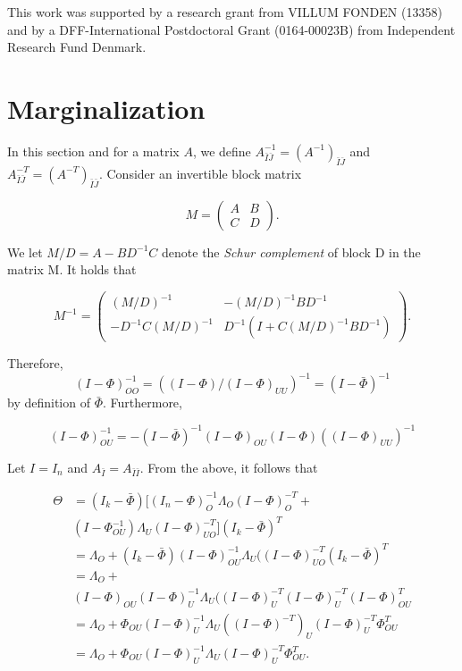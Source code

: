 \documentclass[accepted]{uai2021} %
\begin{document}
\begin{acknowledgements} %
    This work was supported by a research grant from
    VILLUM FONDEN (13358) and by a DFF-International Postdoctoral Grant 
    (0164-00023B) from Independent Research Fund Denmark.
\end{acknowledgements}

\appendix

\section{Marginalization}
\label{sec:marg}

In this section and for a matrix $A$, we define $A_{\bar{I}\bar{J}}^{-1} = 
(A^{-1})_{\bar{I}\bar{J}}$ and 
$A_{\bar{I}\bar{J}}^{-T}=(A^{-T})_{\bar{I}\bar{J}}$. Consider an invertible 
block matrix 

$$
M=
\begin{pmatrix}
A & B \\
C & D
\end{pmatrix}.
$$

We let $M / D = A - BD^{-1}C$ denote the \emph{Schur complement} of block D in 
the matrix M. It holds that

$$
M^{-1}=
\begin{pmatrix}
(M/D)^{-1} & -(M/D)^{-1}BD^{-1} \\
-D^{-1}C(M/D)^{-1} & D^{-1}(I + C(M/D)^{-1}BD^{-1})
\end{pmatrix}.
$$

Therefore, $$(I - {\Phi})_{OO}^{-1} = ((I - {\Phi})/(I - 
{\Phi})_{UU})^{-1} = (I- \bar{\Phi})^{-1}$$ by definition of 
$\bar{\Phi}$. 
Furthermore, 

$$
(I-{\Phi})_{OU}^{-1} = 
-(I-\bar{\Phi})^{-1}(I-{\Phi})_{OU}(I-{\Phi})((I-{\Phi})_{UU})^{-1}
$$

Let $I = I_n$ and $A_{\bar{I}}=A_{\bar{I}\bar{I}}$. From the above, it 
follows 
that

\begin{align*}
\Theta & = (I_k - \bar{\Phi})[(I_n - 
{\Phi})_{O}^{-1}{\Lambda}_{O}(I - {\Phi})_{O}^{-T} + \\ 
&  
(I 
- 
{\Phi}_{OU}^{-1}){\Lambda}_{U}(I - 
{\Phi})_{UO}^{-T}](I_k - 
\bar{\Phi})^T \\
& = {\Lambda}_{O} + (I_k - \bar{\Phi})(I 
- 
{\Phi})_{OU}^{-1}{\Lambda}_{U}((I - 
{\Phi})_{UO}^{-T}(I_k - 
\bar{\Phi})^T \\
& = {\Lambda}_{O} + \\ & (I - {\Phi})_{OU}(I - 
{\Phi})_{U}^{-1}{\Lambda}_{U}((I - 
{\Phi})_{U}^{-T}(I - 
{\Phi})_{U}^{-T}(I - 
{\Phi})_{OU}^T \\
& = {\Lambda}_{O} + {\Phi}_{OU}(I - 
{\Phi})_{U}^{-1}{\Lambda}_{U}((I - 
{\Phi})^{-T})_{U}(I - 
{\Phi})_{U}^{-T} 
{\Phi}_{OU}^T \\
& = {\Lambda}_{O} + {\Phi}_{OU}(I - 
{\Phi})_{U}^{-1}{\Lambda}_{U} (I - 
{\Phi})_{U}^{-T}
{\Phi}_{OU}^T.
\end{align*}



\end{document}
